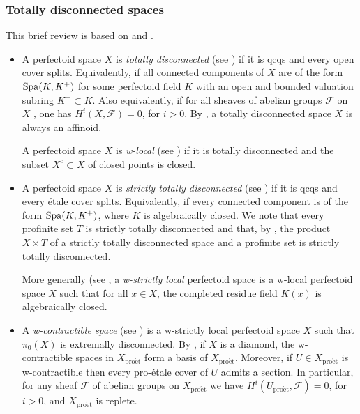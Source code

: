 \documentclass[10pt]{amsart}
\theoremstyle{definition}
\theoremstyle{remark}
\newcommand{\proeet}{\operatorname{pro\acute{e}t} }
\newcommand{\sff}{{\mathcal{F}}}
\numberwithin{equation}{section}
\numberwithin{equation}{section}
\begin{document}
\subsubsection{Totally disconnected spaces} This brief review is based on \cite[Sec. 7]{SchD} and \cite{MW}. 
\begin{itemize}
\item A perfectoid space $X$ is {\em  totally disconnected}  (see \cite[Def. 7.1, Lemma 7.2, Lemma 7.3]{SchD}) if it is qcqs and every  open cover splits. Equivalently, if all connected components of $X$ are of the form
${\rm Spa}(K,K^+)$ for some perfectoid field $K$ with an open and bounded valuation subring $ K^+\subset K$.
 Also equivalently, 
if for all sheaves of abelian groups $\sff$ on $X$ , one has $H^i(X,\sff)=0$, for $i>0$. 
 By \cite[Lemma 7.5]{SchD}, a totally disconnected space $X$ is always an affinoid. 

  A perfectoid space $X$ is {\em w-local} (see \cite[Def. 7.4]{SchD}) if it is  totally disconnected  and the subset $X^c\subset X$ of closed points is closed.
  
 \item  A perfectoid space $X$ is {\em strictly totally disconnected} (see \cite[Def. 7.15]{SchD}) if it is qcqs and every \'etale cover splits. Equivalently, if every connected component is of the form ${\rm Spa}(K,K^+)$, where $K$ is algebraically closed. We note that every profinite set $T$ is strictly totally disconnected and that, by \cite[Lemma 7.19]{SchD}, the product $X\times T$ of a strictly totally disconnected space and a profinite set is strictly totally disconnected. 
 
   More generally (see \cite[Def. 7.17]{SchD},  a {\em w-strictly local } perfectoid space is a w-local perfectoid space $X$ such that for
all $x \in X$, the completed residue field $K(x)$ is algebraically closed.

 \item  A  {\em w-contractible space} (see \cite[Def. 1.1]{MW}) is a w-strictly local perfectoid space $X$ such that $\pi_0(X)$
is extremally disconnected. By \cite[Lemma 1.2]{MW}, if $X$ is a diamond,  the w-contractible spaces in  $X_{\proeet}$ form a basis of
$X_{\proeet}$. Moreover, if $U \in X_{\proeet}$ is w-contractible then  every pro-\'etale cover of $ U$ admits a section. In particular, for any sheaf $\sff$ of abelian groups
on $X_{\proeet}$ we have $H^i(U_{\proeet}, \sff) = 0$, for $i >0$, and $X_{\proeet}$ is replete.
\end{itemize}
\end{document}
